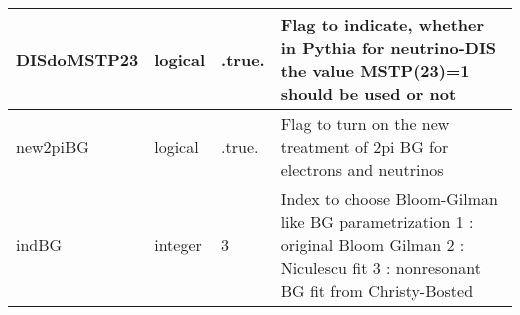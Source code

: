 \documentclass{article}
\begin{document}
\begin{longtable}{llll}
\midrule
DISdoMSTP23 & \begin{minipage}[t]{2cm}logical\end{minipage} & \begin{minipage}[t]{2cm}.true.\end{minipage} & \begin{minipage}[t]{12cm}Flag to indicate, whether in Pythia for neutrino-DIS the value MSTP(23)=1 should be used or not\end{minipage}\\*
\midrule
new2piBG & \begin{minipage}[t]{2cm}logical\end{minipage} & \begin{minipage}[t]{2cm}.true.\end{minipage} & \begin{minipage}[t]{12cm}Flag to turn on the new treatment of 2pi BG for electrons and neutrinos\end{minipage}\\*
\midrule
indBG & \begin{minipage}[t]{2cm}integer\end{minipage} & \begin{minipage}[t]{2cm}3\end{minipage} & \begin{minipage}[t]{12cm}Index to choose Bloom-Gilman like BG parametrization 1 : original Bloom Gilman 2 : Niculescu fit 3 : nonresonant BG fit from Christy-Bosted\end{minipage}\\*
\bottomrule
\end{longtable}
{ }



\end{document}
